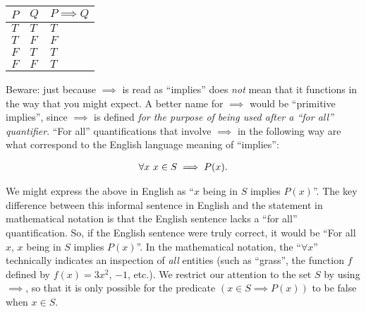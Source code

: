 \begin{table}[H]
    \centering
    \begin{tabular}{|l|l|l|}
    \hline
    $P$ & $Q$ & $P \implies Q$ \\ \hline
    $T$ & $T$ & $T$        \\ \hline
    $T$ & $F$ & $F$        \\ \hline
    $F$ & $T$ & $T$        \\ \hline
    $F$ & $F$ & $T$        \\ \hline
    \end{tabular}
\end{table}

Beware: just because $\implies$ is read as ``implies'' does \textit{not} mean that it functions in the way that you might expect. A better name for $\implies$ would be ``primitive implies'', since $\implies$ is defined \textit{for the purpose of being used after a ``for all'' quantifier}. ``For all'' quantifications that involve $\implies$ in the following way are what correspond to the English language meaning of ``implies'':

\begin{align*}
    \forall x \text{ } x \in S \implies P(x).
\end{align*}

We might express the above in English as ``$x$ being in $S$ implies $P(x)$''. The key difference between this informal sentence in English and the statement in mathematical notation is that the English sentence lacks a ``for all'' quantification. So, if the English sentence were truly correct, it would be ``For all $x$, $x$ being in $S$ implies $P(x)$''. In the mathematical notation, the ``$\forall x$'' technically indicates an inspection of \textit{all} entities (such as ``grass'', the function $f$ defined by $f(x) = 3x^2$, $-1$, etc.). We restrict our attention to the set $S$ by using $\implies$, so that it is only possible for the predicate $(x \in S \implies P(x))$ to be false when $x \in S$.


